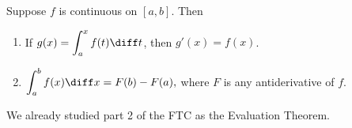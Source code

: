\begin{frame}
\begin{theorem}
Suppose $f$ is continuous on $[a, b]$.  Then 
\begin{enumerate}
\item  If $g(x) = \displaystyle \int_a^x f(t) \diff t$, then $g'(x) = f(x)$.  
\item  $\displaystyle \int_a^b f(x) \diff x = F(b) - F(a),$ where $F$ is any antiderivative of $f$.
\end{enumerate}
\end{theorem}
We already studied part 2 of the FTC as the Evaluation Theorem.
\end{frame}
